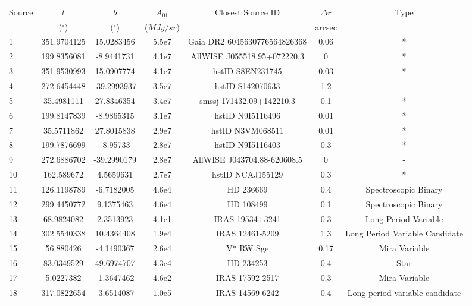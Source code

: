 \documentclass{aa}
\begin{document}
\begin{table}
    \centering
    \begin{tabular}{l c c c c c c}
    \hline
    \hline
     Source & $l$ & $b$ & $A_{01}$ & Closest Source ID & $\Delta r$ & Type \\ 
     & ($^{\circ}$) & ($^{\circ}$) & ($MJy/sr$) & & arcsec &  \\
    
     \hline
     1 \rule{0pt}{2ex} & 351.9704125 & 15.0283456 & 5.5e7 & Gaia DR2 6045630776564826368 & 0.06 & * \\
     2 & 199.8356081 & -8.9441731 & 4.1e7 & AllWISE	J055518.95+072220.3 & 0 & * \\
	 3 & 351.9530993 & 15.0907774 & 4.1e7 & hstID S8EN231745 & 0.03 & * \\
     4 & 272.6454448 & -39.2993937 & 3.5e7 & hstID S142070633 & 1.2 & -\\
	 5 & 35.4981111 & 27.8346354 & 3.4e7 & smssj 171432.09+142210.3 & 0.1 & *\\ 
	 6 & 199.8147839 & -8.9865315 & 3.1e7 & hstID N9I5116496 & 0.01 & *\\ 
	 7 & 35.5711862 &  27.8015838 & 2.9e7 & hstID N3VM068511 & 0.01 & * \\
	 8 & 199.7876699 & -8.95733 & 2.8e7 & hstID N9I5116403 & 0.3 & * \\ 
	 9 & 272.6886702 & -39.2990179 & 2.8e7 & AllWISE	J043704.88-620608.5  & 0 & -\\ 
	 10 & 162.589672 & 4.5659631 & 2.7e7 & hstID NCAJ155129 & 0.3 & *\\ 
	 11 & 126.1198789 & -6.7182005 & 4.6e4 & HD 236669 & 0.4 & Spectroscopic Binary\\ 
	 12 & 299.4450772 & 9.1375463 & 4.6e4 & HD 108499 & 0.1 & Spectroscopic Binary\\ 
	 13 & 68.9824082 & 2.3513923 & 4.1e1 & IRAS 19534+3241 & 0.3 & Long-Period Variable\\
	 14 & 302.5540338 &  10.4364408 & 1.9e4 & IRAS 12461-5209 & 1.3 & Long Period Variable Candidate\\
	 15 & 56.880426 & -4.1490367 & 2.6e4 & V* RW Sge  & 0.17 & Mira Variable \\
	 16 & 83.0349529 & 49.6974707 & 4.3e4 & HD 234253 & 0.4 & Star\\
	 17 & 5.0227382 & -1.3647462 & 4.6e2 & IRAS 17592-2517 & 0.3 & Mira Variable\\ 
	 18 & 317.0822654 & -3.6514087 & 1.0e5 & IRAS 14569-6242 & 0.4 & Long period variable candidate \\

\end{tabular}
\end{table}
\end{document}
